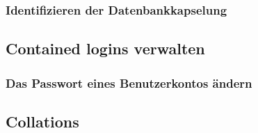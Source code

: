           \subsubsection{Identifizieren der Datenbankkapselung}
        \subsection{Contained logins verwalten}
          \subsubsection{Das Passwort eines Benutzerkontos ändern}

        \subsection{Collations}
